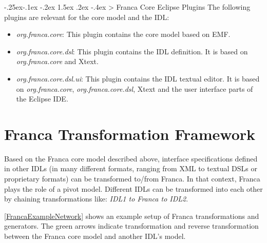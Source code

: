 \documentclass[a4paper,10pt]{scrreprt}
\makeatletter
\renewcommand\subsection{\medskip\@startsection{subsection}{2}{\z@}%
  {-.25ex\@plus -.1ex \@minus -.2ex}%
  {1.5ex \@plus .2ex \@minus -.4ex}%
  {\ifnum \scr@compatibility>\@nameuse{scr@v@2.96}\relax
    \setlength{\parfillskip}{\z@ plus 1fil}\fi
    \raggedsection\normalfont\sectfont\nobreak\size@subsection
  }%
}
\newlength{\XdocItemIndent}
\makeatother
\begin{document}
\subsection{Franca Core Eclipse Plugins}
\label{FrancaConcepts_IDL_CoreModel_Plugins}
The following plugins are relevant for the core model and the IDL:
\setlength{\XdocItemIndent}{\textwidth}
\begin{itemize}
\addtolength{\XdocItemIndent}{-2.5em}
\item \begin{minipage}[t]{\XdocItemIndent}
\textit{org.franca.core}: This plugin contains the core model based on EMF.

\end{minipage}
\item \begin{minipage}[t]{\XdocItemIndent}
\textit{org.franca.core.dsl}: This plugin contains the IDL definition.
		It is based on \textit{org.franca.core} and Xtext.

\end{minipage}
\item \begin{minipage}[t]{\XdocItemIndent}
\textit{org.franca.core.dsl.ui}: This plugin contains the IDL textual editor.
		It is based on \textit{org.franca.core}, \textit{org.franca.core.dsl}, Xtext and
		the user interface parts of the Eclipse IDE.

\end{minipage}
\end{itemize}
\addtolength{\XdocItemIndent}{2.5em}

\section{Franca Transformation Framework}
\label{FrancaConcepts_IDL_Transformations}
Based on the Franca core model described above, interface specifications
defined in other IDLs (in many different formats, ranging from XML to textual DSLs
or proprietary formats) can be transformed to/from Franca.
In that context, Franca plays the role of a pivot model. Different IDLs can be 
transformed into each other by chaining transformations like: \textit{IDL1 to Franca to IDL2}.

\autoref{FrancaExampleNetwork} shows an example setup of Franca transformations and generators.
The green arrows indicate transformation and reverse transformation between the
Franca core model and another IDL's model. 
\end{document}
